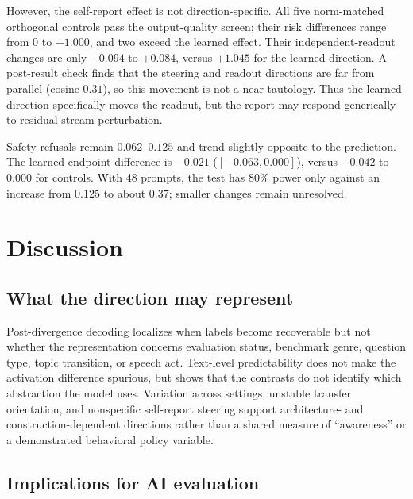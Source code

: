 \documentclass{article}
\begin{document}
However, the self-report effect is not direction-specific. All five
norm-matched orthogonal controls pass the output-quality screen; their risk
differences range from $0$ to $+1.000$, and two exceed the learned effect. Their
independent-readout changes are only $-0.094$ to $+0.084$, versus $+1.045$ for
the learned direction. A post-result check finds that the steering and readout
directions are far from parallel (cosine $0.31$), so this movement is not a
near-tautology. Thus the learned direction specifically moves the
readout, but the report may respond generically to residual-stream perturbation.

Safety refusals remain $0.062$--$0.125$ and trend slightly opposite to the
prediction. The learned endpoint difference is $-0.021$ ($[-0.063,0.000]$),
versus $-0.042$ to $0.000$ for controls. With 48 prompts, the test has 80\%
power only against an increase from $0.125$ to about $0.37$; smaller changes
remain unresolved.

\FloatBarrier
\section{Discussion}

\subsection{What the direction may represent}

Post-divergence decoding localizes when labels become recoverable but not whether
the representation concerns evaluation status, benchmark genre, question type,
topic transition, or speech act. Text-level predictability does not make the
activation difference spurious, but shows that the contrasts do not identify
which abstraction the model uses. Variation across settings, unstable transfer
orientation, and nonspecific self-report steering support architecture- and
construction-dependent directions rather than a shared measure of ``awareness''
or a demonstrated behavioral policy variable.

\subsection{Implications for AI evaluation}
\end{document}
